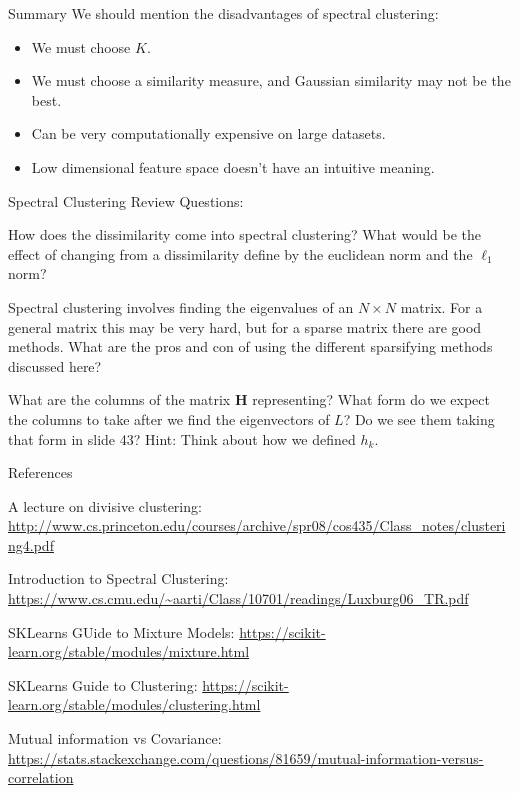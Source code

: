 \documentclass[10pt, table, dvipsnames,xcdraw, handout]{beamer}
\begin{document}
\begin{frame}[fragile]{Summary}
We should mention the disadvantages of spectral clustering:\pause
\begin{itemize}
\item[] We must choose $K$. \pause
\item[] We must choose a similarity measure, and Gaussian similarity may not be the best. \pause
\item[] Can be very computationally expensive on large datasets. \pause
\item[] Low dimensional feature space doesn't have an intuitive meaning.
\end{itemize}
\end{frame}


\begin{frame}[fragile]{Spectral Clustering}
Review Questions:

How does the dissimilarity come into spectral clustering? What would be the effect of changing from a dissimilarity define by the euclidean norm and the $\ell_1$ norm?

Spectral clustering involves finding the eigenvalues of an $N\times N$ matrix. For a general matrix this may be very hard, but for a sparse matrix there are good methods. What are the pros and con of using the different sparsifying methods discussed here?

What are the columns of the matrix $\mathbf{H}$ representing? What form do we expect the columns to take after we find the eigenvectors of $L$? Do we see them taking that form in slide 43? Hint: Think about how we defined $h_k$. 

\end{frame}





\begin{frame}[fragile]{References}

A lecture on divisive clustering:
\url{http://www.cs.princeton.edu/courses/archive/spr08/cos435/Class_notes/clustering4.pdf}

Introduction to Spectral Clustering:
\url{https://www.cs.cmu.edu/~aarti/Class/10701/readings/Luxburg06_TR.pdf}

SKLearns GUide to Mixture Models:
\url{https://scikit-learn.org/stable/modules/mixture.html}

SKLearns Guide to Clustering:
\url{https://scikit-learn.org/stable/modules/clustering.html}

Mutual information vs Covariance:
\url{https://stats.stackexchange.com/questions/81659/mutual-information-versus-correlation}
\end{frame}
\end{document}
